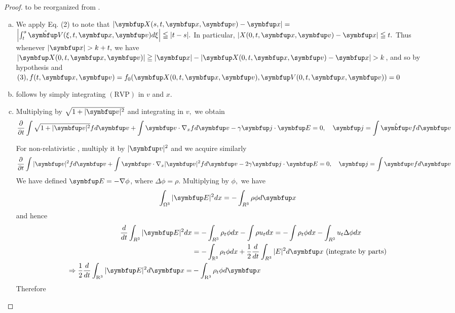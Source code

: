 \begin{proof}
    \eqrvp to be reorganized from \cite{glassey_symmetric_1985}.

    \begin{enumerate}[(a)]
      \item We apply Eq. (2) to note that $|\vect{X}(s, t, \vx, \vv)-\vx|=$ $\left|\int_{t}^{s} \hat{\vect{V}}(\xi, t, \vx, \vv) d \xi\right| \leqq|t-s| .$ In particular, $|X(0, t, \vx, \vv)-\vx| \leqq t .$ Thus whenever $|\vx|>k+t,$ we have $|\vect{X}(0, t, \vx, \vv)| \geqq|\vx|-|\vect{X}(0, t, \vx, \vv)-\vx|>k$, and so by hypothesis and
      $(3), f(t, \vx, \vv)=f_0(\vect{X}(0, t, \vx, \vv), \vect{V}(0, t, \vx, \vv))=0$
      \item follows by simply integrating $(\mathrm{RVP})$ in $v$ and $x$.
      \item
      
      Multiplying \eqrvp by $\sqrt{1+|\vv|^{2}}$ and integrating in $v,$ we obtain
      \begin{equation}
        \label{eq:rvp_second_moment}
        \frac{\partial}{\partial t} \int \sqrt{1+|\vv|^{2}} f d \vv+\int \vv \cdot \nabla_{x} f d \vv-\gamma \vj \cdot \vE=0, \quad \vect{j}=\int \hat{\vv}f d \vv
      \end{equation}

      For non-relativistic \eqvp, multiply it by $|\vv|^2$ and we acquire similarly
      \begin{equation}
        \label{eq:vp_second_moment}
        \frac{\partial}{\partial t} \int |\vv|^{2} f d \vv+\int \vv \cdot \nabla_{x} |\vv|^2 f d \vv-2\gamma \vj \cdot \vE=0, \quad \vect{j}=\int \vv f d \vv
      \end{equation}
       We have defined $\vE= - \nabla \phi$, where $\Delta \phi=\rho$. Multiplying by $\phi,$ we have
      \[
      \int_{\Omega^{3}}|\vE|^{2} d x=-\int_{R^{3}} \rho \phi d \vx
      \]
      and hence
      \[
      \begin{aligned}
      \frac{d}{d t} \int_{R^{3}}|\vE|^{2} d x &=-\int_{R^{3}} \rho_{t} \phi d x-\int \rho u_{t} d x=-\int \rho_{t} \phi d x-\int_{R^{3}} u_{t} \Delta \phi d x \\
      &=-\int_{\mathbb{R}^{3}} \rho_{t} \phi d x+\frac{1}{2} \frac{d}{d t} \int_{R^{3}}|E|^{2} d \vx \text{ (integrate by parts)}\\
      \Rightarrow \frac{1}{2} \frac{d}{d t} \int_{\mathrm{R}^{3}}|\vE|^{2} d \vx=&-\int_{\mathrm{R}^{3}} \rho_{t} \phi d \vx
      \end{aligned}
      \]
      Therefore
      

\end{enumerate}
\end{proof}
